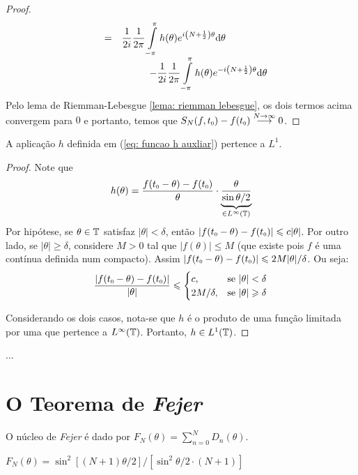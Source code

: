 \documentclass[../main.tex]{subfiles}
\begin{document}
\begin{teorema}
\begin{proof}
\begin{equation*}
\begin{array}{rcl}
            &=& \displaystyle \dfrac{1}{2i}\dfrac{1}{2\pi} \int\limits_{-\pi}^\pi h(\theta) e^{i\left(N+\frac12\right)\theta} {\operatorname{d}}{\theta} \\
            & &\displaystyle \hspace{1cm}- \dfrac{1}{2i}\dfrac{1}{2\pi} \int\limits_{-\pi}^\pi h(\theta)e^{-i\left(N+\frac12\right)\theta} {\operatorname{d}}{\theta}  \\
        \end{array}
        \end{equation*}
        Pelo lema de Riemman-Lebesgue \ref{lema: riemman lebesgue}, os dois termos acima convergem para $0$ e portanto, temos que $S_N(f,\sub t0) - f(\sub t0) \overset{N\to \infty}{\longto} 0$.
    \end{proof}
\end{teorema}

\begin{lema}
    \label{lema: funcao h auxiliar eh L1}
    A aplicação $h$ definida em (\ref{eq: funcao h auxliar}) pertence a $L^1$.
    \begin{proof} 
        Note que
        \begin{equation*}
            h(\theta) = \dfrac{f(\sub t0 - \theta)- f(\sub t0)}\theta \cdot \underbrace{\dfrac\theta{\sin \theta/2}}_{\in L^\infty(\UnitalCircle)}
        \end{equation*}
        Por hipótese, se $\theta\in \mathbb T$ satisfaz $|\theta| < \delta$, então $|f(\sub t0 - \theta) - f(\sub t0)| \leqslant c|\theta|$. Por outro lado, se $|\theta| \geqslant \delta$, considere $M > 0$ tal que $|f(\theta)| \leqslant M$ (que existe pois $f$ é uma  contínua definida num compacto).  Assim $|f(\sub t0 - \theta) - f(\sub t0)| \leqslant 2M|\theta|/\delta$. Ou seja:
        \begin{equation*}
            \dfrac{|f(\sub t0 - \theta) - f(\sub t0)|}{|\theta|} \leqslant \begin{cases}
                c, & \text{se }|\theta| < \delta \\
                2M/\delta, & \text{se }|\theta|\geqslant \delta
            \end{cases}
        \end{equation*}

        Considerando os dois casos, nota-se que $h$ é o produto de uma função limitada por uma que pertence a $L^\infty(\mathbb T)$. Portanto, $h \in L^1(\mathbb T)$.
    \end{proof}
\end{lema}
...
\section{O Teorema de \textit{Fejer}}

\begin{definicao}
    \label{def: nucleo de fejer}
    O núcleo de \textit{Fejer} é dado por $F_N(\theta) = \sum_{n=0}^N D_n(\theta)$.
\end{definicao}
    
    
\begin{lema}
    $F_N(\theta) = \sin^2 [(N+1)\theta/2] / [\sin^2 \theta/2 \cdot (N+1)]$
\end{lema}
\end{document}
